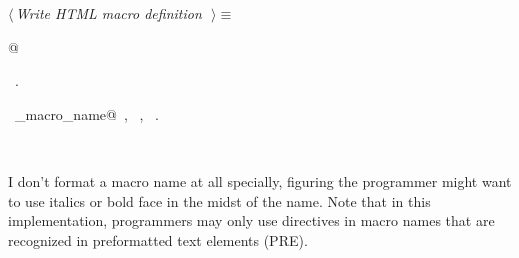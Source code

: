 \documentclass{report}
\begin{document}
\begin{flushleft} \small
\begin{minipage}{\linewidth} \label{scrap102}
$\langle\,${\it Write HTML macro definition}\nobreak\ {\footnotesize {}}$\,\rangle\equiv$
\vspace{-1ex}
\begin{list}{}{} \item
\mbox{}@{\NWsep}
\end{list}
\vspace{-1ex}
\footnotesize\addtolength{\baselineskip}{-1ex}
\begin{list}{}{\setlength{\itemsep}{-\parsep}\setlength{\itemindent}{-\leftmargin}}
\item \NWtxtMacroRefIn\ .
\end{list}
\vspace{-2ex}
\footnotesize\addtolength{\baselineskip}{-1ex}
\begin{list}{}{\setlength{\itemsep}{-\parsep}\setlength{\itemindent}{-\leftmargin}}
\item \NWtxtIdentsUsed\nobreak\  \verb@collect_macro_name@\nobreak\ , \verb@Name@\nobreak\ , \verb@scraps@\nobreak\ .\end{list}
\end{minipage}\\[4ex]
\end{flushleft}
I don't format a macro name at all specially, figuring the programmer
might want to use italics or bold face in the midst of the name.  Note
that in this implementation, programmers may only use directives in
macro names that are recognized in preformatted text elements (PRE).
\end{document}
